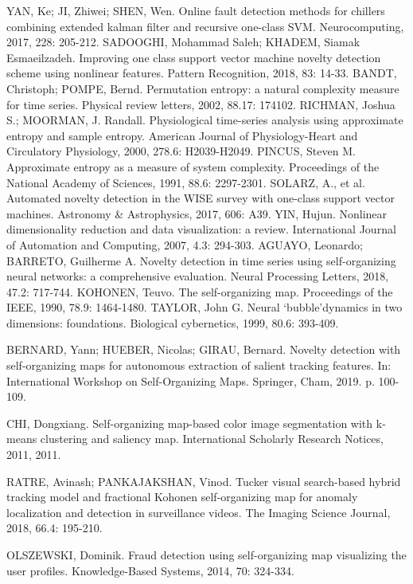 \documentclass[11pt,twoside,openright]{report}
\begin{document}
\begin{thebibliography}{L}
YAN, Ke; JI, Zhiwei; SHEN, Wen. Online fault detection methods for chillers combining extended kalman filter and recursive one-class SVM. Neurocomputing, 2017, 228: 205-212.
SADOOGHI, Mohammad Saleh; KHADEM, Siamak Esmaeilzadeh. Improving one class support vector machine novelty detection scheme using nonlinear features. Pattern Recognition, 2018, 83: 14-33.
BANDT, Christoph; POMPE, Bernd. Permutation entropy: a natural complexity measure for time series. Physical review letters, 2002, 88.17: 174102.
RICHMAN, Joshua S.; MOORMAN, J. Randall. Physiological time-series analysis using approximate entropy and sample entropy. American Journal of Physiology-Heart and Circulatory Physiology, 2000, 278.6: H2039-H2049.
PINCUS, Steven M. Approximate entropy as a measure of system complexity. Proceedings of the National Academy of Sciences, 1991, 88.6: 2297-2301.
SOLARZ, A., et al. Automated novelty detection in the WISE survey with one-class support vector machines. Astronomy \& Astrophysics, 2017, 606: A39.
YIN, Hujun. Nonlinear dimensionality reduction and data visualization: a review. International Journal of Automation and Computing, 2007, 4.3: 294-303.
AGUAYO, Leonardo; BARRETO, Guilherme A. Novelty detection in time series using self-organizing neural networks: a comprehensive evaluation. Neural Processing Letters, 2018, 47.2: 717-744.
KOHONEN, Teuvo. The self-organizing map. Proceedings of the IEEE, 1990, 78.9: 1464-1480.
TAYLOR, John G. Neural ‘bubble’dynamics in two dimensions: foundations. Biological cybernetics, 1999, 80.6: 393-409.

BERNARD, Yann; HUEBER, Nicolas; GIRAU, Bernard. Novelty detection with self-organizing maps for autonomous extraction of salient tracking features. In: International Workshop on Self-Organizing Maps. Springer, Cham, 2019. p. 100-109.

CHI, Dongxiang. Self-organizing map-based color image segmentation with k-means clustering and saliency map. International Scholarly Research Notices, 2011, 2011.

RATRE, Avinash; PANKAJAKSHAN, Vinod. Tucker visual search-based hybrid tracking model and fractional Kohonen self-organizing map for anomaly localization and detection in surveillance videos. The Imaging Science Journal, 2018, 66.4: 195-210.


OLSZEWSKI, Dominik. Fraud detection using self-organizing map visualizing the user profiles. Knowledge-Based Systems, 2014, 70: 324-334.


\end{thebibliography}
\end{document}
